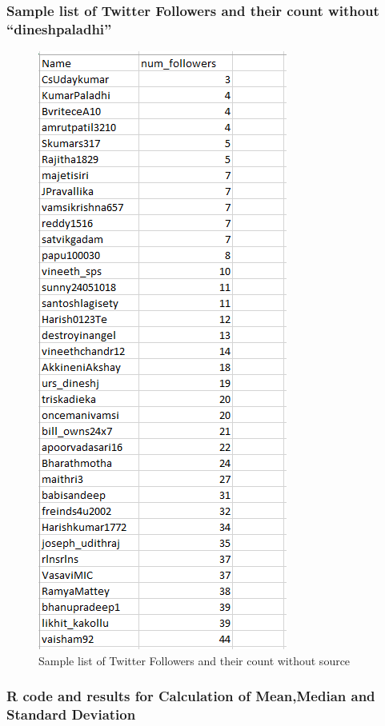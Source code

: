 \subsubsection{Sample list of Twitter Followers and their count without ``dineshpaladhi''}
\begin{figure}[ht]    
    \begin{center}
        \includegraphics[scale=0.9]{followers_without_source_twt.png}
        \caption{Sample list of Twitter Followers and their count without source}
        \label{Sample_t2}
    \end{center}
\end{figure}
\newpage
\subsubsection{R code and results for Calculation of Mean,Median and Standard Deviation}


